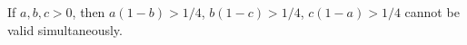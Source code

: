 If $a, b, c > 0$, then $a(1 - b) > 1/4$, $b(1 - c) > 1/4$, $c(1 - a) > 1/4$ cannot be valid simultaneously.
